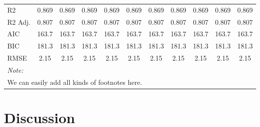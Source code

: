 \documentclass[
  12pt,
]{article}
\begin{document}
{\begin{landscape}
\begin{longtable}[t]{lcccccccccc}
R2 & \num{0.869} & \num{0.869} & \num{0.869} & \num{0.869} & \num{0.869} & \num{0.869} & \num{0.869} & \num{0.869} & \num{0.869} & \num{0.869}\\
R2 Adj. & \num{0.807} & \num{0.807} & \num{0.807} & \num{0.807} & \num{0.807} & \num{0.807} & \num{0.807} & \num{0.807} & \num{0.807} & \num{0.807}\\
AIC & \num{163.7} & \num{163.7} & \num{163.7} & \num{163.7} & \num{163.7} & \num{163.7} & \num{163.7} & \num{163.7} & \num{163.7} & \num{163.7}\\
BIC & \num{181.3} & \num{181.3} & \num{181.3} & \num{181.3} & \num{181.3} & \num{181.3} & \num{181.3} & \num{181.3} & \num{181.3} & \num{181.3}\\
RMSE & \num{2.15} & \num{2.15} & \num{2.15} & \num{2.15} & \num{2.15} & \num{2.15} & \num{2.15} & \num{2.15} & \num{2.15} & \num{2.15}\\*
\multicolumn{11}{l}{\rule{0pt}{1em}\textit{Note: }}\\
\multicolumn{11}{l}{\rule{0pt}{1em}We can easily add all kinds of footnotes here.}\\
\end{longtable}
\end{landscape}
}

\hypertarget{discussion}{%
\section{Discussion}\label{discussion}}
\end{document}
